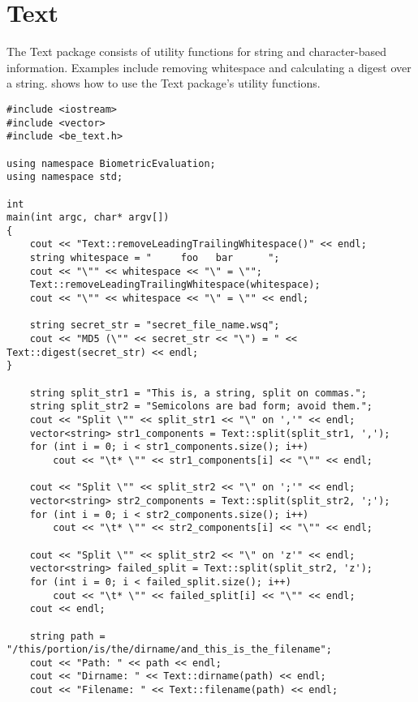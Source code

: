 %
%
\chapter{Text}
\label{chp-text}
The Text package consists of utility functions for string and character-based
information. Examples include removing whitespace and calculating a digest over
a string.  shows how to use the Text package's utility
functions.

\begin{lstlisting}[caption={Using the Text Package}, label=textuse]
#include <iostream>
#include <vector>
#include <be_text.h>

using namespace BiometricEvaluation;
using namespace std;

int
main(int argc, char* argv[])
{
    cout << "Text::removeLeadingTrailingWhitespace()" << endl;
    string whitespace = "     foo   bar      ";
    cout << "\"" << whitespace << "\" = \"";
    Text::removeLeadingTrailingWhitespace(whitespace);
    cout << "\"" << whitespace << "\" = \"" << endl;

    string secret_str = "secret_file_name.wsq";
    cout << "MD5 (\"" << secret_str << "\") = " << Text::digest(secret_str) << endl;
}

    string split_str1 = "This is, a string, split on commas.";
    string split_str2 = "Semicolons are bad form; avoid them.";
    cout << "Split \"" << split_str1 << "\" on ','" << endl;
    vector<string> str1_components = Text::split(split_str1, ',');
    for (int i = 0; i < str1_components.size(); i++)
        cout << "\t* \"" << str1_components[i] << "\"" << endl;

    cout << "Split \"" << split_str2 << "\" on ';'" << endl;
    vector<string> str2_components = Text::split(split_str2, ';');
    for (int i = 0; i < str2_components.size(); i++)
        cout << "\t* \"" << str2_components[i] << "\"" << endl;

    cout << "Split \"" << split_str2 << "\" on 'z'" << endl;
    vector<string> failed_split = Text::split(split_str2, 'z');
    for (int i = 0; i < failed_split.size(); i++)
        cout << "\t* \"" << failed_split[i] << "\"" << endl;
    cout << endl;

    string path = "/this/portion/is/the/dirname/and_this_is_the_filename";
    cout << "Path: " << path << endl;
    cout << "Dirname: " << Text::dirname(path) << endl;
    cout << "Filename: " << Text::filename(path) << endl;

\end{lstlisting}

